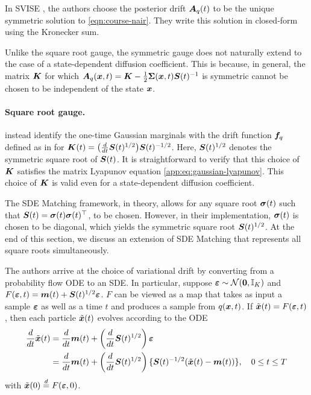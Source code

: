 In SVISE \cite{course2023state, course2023amortized}, the authors choose the posterior drift $\boldsymbol{A}_q(t)$ to be the unique symmetric solution to \cref{eqn:course-nair}. They write this solution in closed-form using the Kronecker sum.

Unlike the square root gauge, the symmetric gauge does not naturally extend to the case of a state-dependent diffusion coefficient. This is because, in general, the matrix $\boldsymbol{K}$ for which $\boldsymbol{A}_q(\boldsymbol{x}, t) = \boldsymbol{K} - \frac{1}{2}\boldsymbol{\Sigma}(\boldsymbol{x}, t) \boldsymbol{S}(t)^{-1}$ is symmetric cannot be chosen to be independent of the state $\boldsymbol{x}$.

\paragraph{Square root gauge.}
\citet{bartosh2025sde} instead identify the one-time Gaussian marginals with the drift function $\boldsymbol{f}_q$ defined as in  for $\boldsymbol{K}(t) = \bigl(\frac{d}{dt}\boldsymbol{S}(t)^{1/2}\bigr)\boldsymbol{S}(t)^{-1/2}$. 
Here, $\boldsymbol{S}(t)^{1/2}$ denotes the symmetric square root of $\boldsymbol{S}(t)$.
It is straightforward to verify that this choice of $\boldsymbol{K}$ satisfies the matrix Lyapunov equation \eqref{app:eq:gaussian-lyapunov}. This choice of $\boldsymbol{K}$ is valid even for a state-dependent diffusion coefficient.

The SDE Matching framework, in theory, allows for any square root $\boldsymbol{\sigma}(t)$ such that $\boldsymbol{S}(t) = \boldsymbol{\sigma}(t) \boldsymbol{\sigma}(t)^\top$, to be chosen. 
However, in their implementation, $\boldsymbol{\sigma}(t)$ is chosen to be diagonal, which yields the symmetric square root $\boldsymbol{S}(t)^{1/2}$.
At the end of this section, we discuss an extension of SDE Matching that represents all square roots simultaneously.

The authors arrive at the choice of variational drift by converting from a probability flow ODE \cite{songscore2021} to an SDE. In particular, suppose $\boldsymbol{\varepsilon} \sim \mathcal{N}(\boldsymbol{0}, \mathbb{I}_K)$ and $F(\boldsymbol{\varepsilon}, t) = \boldsymbol{m}(t) + \boldsymbol{S}(t)^{1/2}\boldsymbol{\varepsilon}$.
$F$ can be viewed as a map that takes as input a sample $\boldsymbol{\varepsilon}$ as well as a time $t$ and produces a sample from $q(\boldsymbol{x}, t)$.
If $\tilde{\boldsymbol{x}}(t) = F(\boldsymbol{\varepsilon}, t)$, then each particle $\tilde{\boldsymbol{x}}(t)$ evolves according to the ODE
\begin{equation}\label{app:eqn:pf-ode}
    \begin{aligned}
    \frac{d}{dt} \tilde{\boldsymbol{x}}(t) &= \frac{d}{dt}\boldsymbol{m}(t) + \left(\frac{d}{dt}\boldsymbol{S}(t)^{1/2}\right)\boldsymbol{\varepsilon}\\
    &= \frac{d}{dt}\boldsymbol{m}(t) + \left(\frac{d}{dt}\boldsymbol{S}(t)^{1/2}\right)\{\boldsymbol{S}(t)^{-1/2}(\tilde{\boldsymbol{x}}(t) - \boldsymbol{m}(t))\}, \quad 0 \leq t \leq T
    \end{aligned}
\end{equation}
with $\tilde{\boldsymbol{x}}(0) \overset{d}{=} F(\boldsymbol{\varepsilon}, 0)$. 

